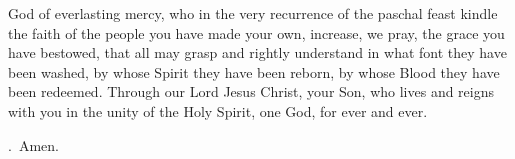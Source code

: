 \lettrine[lines=3]{G}{}od of everlasting mercy,
who in the very recurrence of the paschal feast
kindle the faith of the people you have made your own,
increase, we pray, the grace you have bestowed,
that all may grasp and rightly understand
in what font they have been washed,
by whose Spirit they have been reborn,
by whose Blood they have been redeemed.
Through our Lord Jesus Christ, your Son,
who lives and reigns with you in the unity of the Holy Spirit,
one God, for ever and ever.
\par \Rbar.~Amen.
